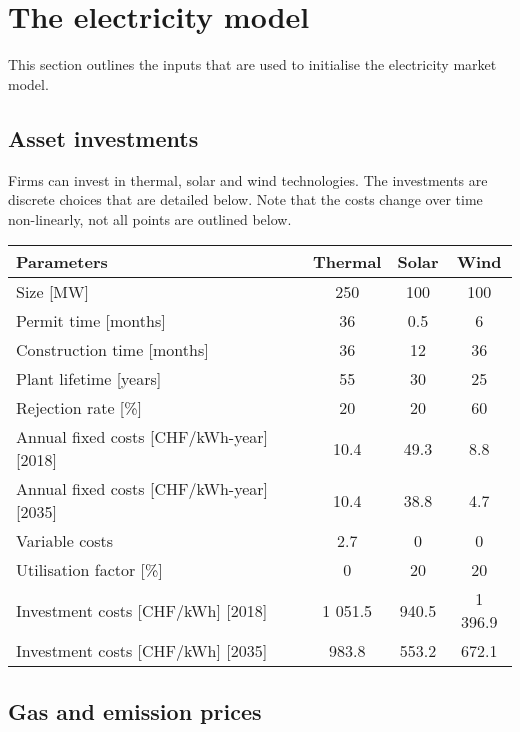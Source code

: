\section{The electricity model}
\label{sec:InputsElec}

This section outlines the inputs that are used to initialise the electricity market model.

\subsection{Asset investments}

Firms can invest in thermal, solar and wind technologies. The investments are discrete choices that are detailed below. Note that the costs change over time non-linearly, not all points are outlined below.

\begin{center}
\begin{tabular}{ |l|c|c|c| } 
\hline
Parameters			& Thermal		& Solar	& Wind	\\ \hline \hline
Size [MW]				& 250 		& 100	& 100	\\ \hline
Permit time [months]		& 36			& 0.5		& 6		\\ \hline
Construction time [months]	
					& 36			& 12		& 36		\\ \hline
Plant lifetime [years]		& 55			& 30		& 25		\\ \hline
Rejection rate [\%]		& 20			& 20		& 60		\\ \hline
Annual fixed costs [CHF/kWh-year][2018]
					& 10.4		& 49.3	& 8.8		\\ \hline
Annual fixed costs [CHF/kWh-year][2035]
					& 10.4		& 38.8	& 4.7		\\ \hline				
Variable costs			& 2.7			& 0		& 0		\\ \hline
Utilisation factor [\%]		& 0			& 20		& 20		 \\ \hline
Investment costs [CHF/kWh] [2018]
					& 1 051.5 		& 940.5 	& 1 396.9	\\ \hline
Investment costs [CHF/kWh] [2035]
					& 983.8 		& 553.2 	& 672.1	\\ \hline
\end{tabular}
\end{center}


\subsection{Gas and emission prices}

